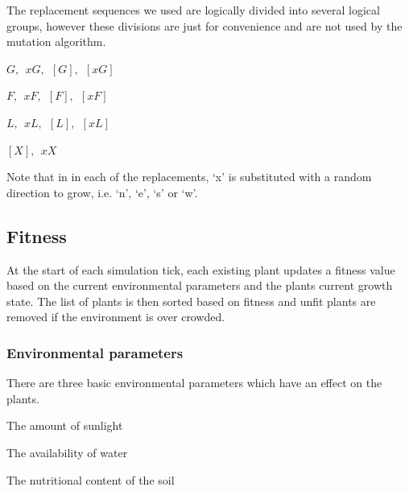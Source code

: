 \documentclass[conference]{acmsiggraph}
\begin{document}
The replacement sequences we used are logically divided into several logical
groups, however these divisions are just for convenience and are not used by the
mutation algorithm.

\begin{description}[leftmargin=!,labelindent=0.2in,labelwidth=0.5in]
  \item[Stems]   $G,~~xG,~~[G],~~[xG]$
  \item[Flowers] $F,~~xF,~~[F],~~[xF]$
  \item[Leaves]  $L,~~xL,~~[L],~~[xL]$
  \item[Other]   $[X],~~xX$
\end{description}

Note that in in each of the replacements, `x' is substituted with a random
direction to grow, i.e. `n', `e', `s' or `w'.

\subsection{Fitness}

% 
% 

At the start of each simulation tick, each existing plant updates a fitness
value based on the current environmental parameters and the plants current
growth state. The list of plants is then sorted based on fitness and unfit
plants are removed if the environment is over crowded.

\subsubsection{Environmental parameters}

There are three basic environmental parameters which have an effect on the
plants.

\begin{description}[leftmargin=!,labelindent=0.2in,labelwidth=0.5in]
  \item[sun]       The amount of sunlight
  \item[water]     The availability of water
  \item[nutrition] The nutritional content of the soil
\end{description}
\end{document}

